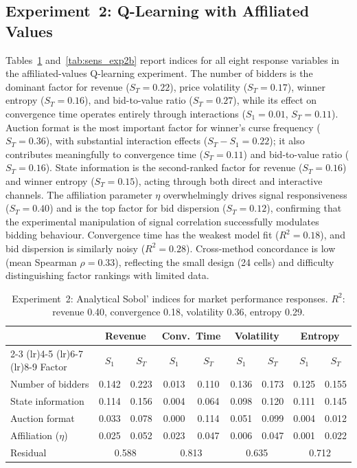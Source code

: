 \subsection{Experiment~2: Q-Learning with Affiliated Values}
\label{sec:sens_exp2}

Tables~\ref{tab:sens_exp2a} and~\ref{tab:sens_exp2b} report indices for all eight response variables in the affiliated-values Q-learning experiment. The number of bidders is the dominant factor for revenue ($S_T = 0.22$), price volatility ($S_T = 0.17$), winner entropy ($S_T = 0.16$), and bid-to-value ratio ($S_T = 0.27$), while its effect on convergence time operates entirely through interactions ($S_1 = 0.01$, $S_T = 0.11$). Auction format is the most important factor for winner's curse frequency ($S_T = 0.36$), with substantial interaction effects ($S_T - S_1 = 0.22$); it also contributes meaningfully to convergence time ($S_T = 0.11$) and bid-to-value ratio ($S_T = 0.16$). State information is the second-ranked factor for revenue ($S_T = 0.16$) and winner entropy ($S_T = 0.15$), acting through both direct and interactive channels. The affiliation parameter $\eta$ overwhelmingly drives signal responsiveness ($S_T = 0.40$) and is the top factor for bid dispersion ($S_T = 0.12$), confirming that the experimental manipulation of signal correlation successfully modulates bidding behaviour. Convergence time has the weakest model fit ($R^2 = 0.18$), and bid dispersion is similarly noisy ($R^2 = 0.28$). Cross-method concordance is low (mean Spearman $\rho = 0.33$), reflecting the small design (24 cells) and difficulty distinguishing factor rankings with limited data.

\begin{table}[H]
\centering
\caption{Experiment~2: Analytical Sobol' indices for market performance responses. $R^2$: revenue 0.40, convergence 0.18, volatility 0.36, entropy 0.29.}
\label{tab:sens_exp2a}
\small
\begin{tabular}{l cc cc cc cc}
\toprule
& \multicolumn{2}{c}{Revenue} & \multicolumn{2}{c}{Conv.\ Time} & \multicolumn{2}{c}{Volatility} & \multicolumn{2}{c}{Entropy} \\
\cmidrule(lr){2-3} \cmidrule(lr){4-5} \cmidrule(lr){6-7} \cmidrule(lr){8-9}
Factor & $S_1$ & $S_T$ & $S_1$ & $S_T$ & $S_1$ & $S_T$ & $S_1$ & $S_T$ \\
\midrule
Number of bidders     & 0.142 & 0.223 & 0.013 & 0.110 & 0.136 & 0.173 & 0.125 & 0.155 \\
State information     & 0.114 & 0.156 & 0.004 & 0.064 & 0.098 & 0.120 & 0.111 & 0.145 \\
Auction format        & 0.033 & 0.078 & 0.000 & 0.114 & 0.051 & 0.099 & 0.004 & 0.012 \\
Affiliation ($\eta$)  & 0.025 & 0.052 & 0.023 & 0.047 & 0.006 & 0.047 & 0.001 & 0.022 \\
\midrule
Residual              & \multicolumn{2}{c}{0.588} & \multicolumn{2}{c}{0.813} & \multicolumn{2}{c}{0.635} & \multicolumn{2}{c}{0.712} \\
\bottomrule
\end{tabular}
\end{table}

